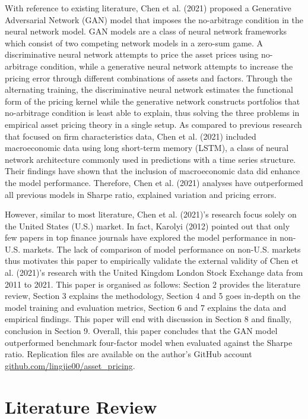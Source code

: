 \documentclass[12pt]{article}
\begin{document}
With reference to existing literature, Chen et al. (2021) proposed a
Generative Adversarial Network (GAN) model that imposes the
no-arbitrage condition in the neural network model.
GAN models are a class of neural network frameworks which
consist of two competing network models in a zero-sum game.
A discriminative neural network attempts to price the asset
prices using no-arbitrage condition, while a generative neural network attempts
to increase the pricing error through different combinations of
assets and factors.
Through the alternating training, the discriminative
neural network estimates the functional form of
the pricing kernel while the
generative network constructs portfolios
that no-arbitrage condition is least able to explain, thus solving the three
problems in empirical asset pricing theory in a single setup.
As compared to previous research that focused on firm
characteristics data, Chen et al. (2021) included
macroeconomic data using long short-term memory (LSTM), a
class of neural network architecture commonly used in
predictions with a time series structure. Their findings
have shown that the inclusion of macroeconomic data did
enhance the model performance.
Therefore, Chen et al. (2021) analyses have outperformed all
previous models in Sharpe ratio, explained variation and
pricing errors.

However, similar to most literature, Chen et al. (2021)'s
research focus solely on the United States (U.S.) market.
In fact, Karolyi (2012) pointed out that only few papers in top
finance journals have explored the model performance in
non-U.S. markets.
The lack of comparison of model performance on non-U.S.
markets thus motivates this paper to empirically validate the
external validity of Chen et al. (2021)'s research with the
United Kingdom London Stock Exchange data from 2011 to 2021.
This paper is organised as follows: Section 2 provides the
literature review, Section 3 explains the methodology,
Section 4 and 5 goes in-depth on the model training and
evaluation metrics, Section 6 and 7 explains the data and
empirical findings.
This paper will end with discussion in Section 8 and
finally, conclusion in Section 9.
Overall, this paper concludes that the GAN model outperformed
benchmark four-factor model when evaluated against the Sharpe
ratio.
Replication files are available on the author's GitHub
account
\href{https://github.com/lingjie00/asset_pricing}{github.com/lingjie00/asset\_pricing}.

\hypertarget{literature-review}{%
\section{Literature Review}\label{literature-review}}
\end{document}
